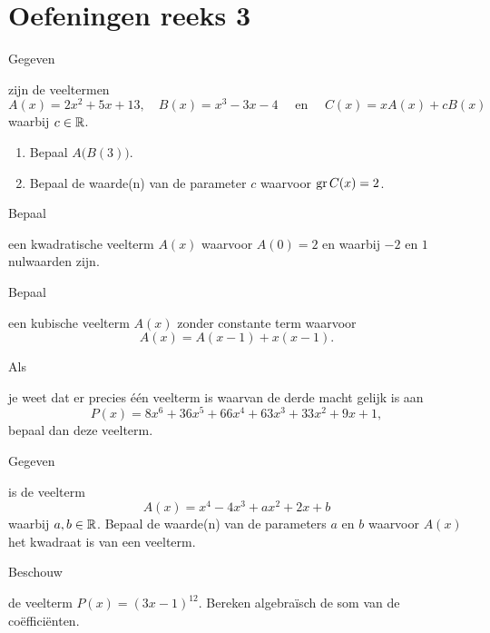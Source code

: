 \documentclass{ximera}
\begin{document}
\clearpage

\section*{Oefeningen reeks 3}

\begin{Oefening}\setcounter{enumi}{12}
\hypertarget{oef1.12}{Gegeven} zijn de veeltermen 
\[
A(x) = 2x^2 + 5x + 13, \quad B(x) =  x^3-3x-4  \quad \text{ en } \quad C(x) = xA(x) + cB(x)
\]
waarbij $c \in \mathbb{R}$.
\begin{enumerate}%
\item
Bepaal $A\bigl(B(3)\bigr)$.
\item
Bepaal de waarde(n) van de parameter $c$ waarvoor $\operatorname{gr} C(x) = 2$.
\end{enumerate}
\end{Oefening}

\begin{Oefening}\setcounter{enumi}{13} 
\hypertarget{oef1.13}{Bepaal} een kwadratische veelterm $A(x)$ waarvoor $A(0) = 2$ en waarbij $-2$ en $1$ nulwaarden zijn.
\end{Oefening}

\begin{Oefening}\setcounter{enumi}{14} 
\hypertarget{oef1.14}{Bepaal} een kubische veelterm $A(x)$ zonder constante term waarvoor
\[
A(x) = A(x-1) + x(x-1).
\]
\end{Oefening}

\begin{Oefening}\setcounter{enumi}{15} 
\hypertarget{oef1.15}{Als} je weet dat er precies \'e\'en veelterm is waarvan de derde macht gelijk is aan 
\[
P(x) = 8x^6 + 36x^5 + 66x^4 + 63x^3 + 33x^2 + 9x + 1,
\]
bepaal dan deze veelterm.
\end{Oefening}

\begin{Oefening}\setcounter{enumi}{16} 
\hypertarget{oef1.16}{Gegeven} is de veelterm
\[
A(x) = x^4 - 4x^3 + ax^2 + 2x + b
\]
waarbij $a,b \in \mathbb{R}$. Bepaal de waarde(n) van de parameters $a$ en $b$ waarvoor $A(x)$ het kwadraat is van een veelterm. 
\end{Oefening}

\begin{Oefening}\setcounter{enumi}{17} 
\hypertarget{oef1.17}{Beschouw} de veelterm $P(x) = (3x - 1)^{12}$. Bereken algebra\"isch de som van de co\"effici\"enten. 
\end{Oefening}
\end{document}

